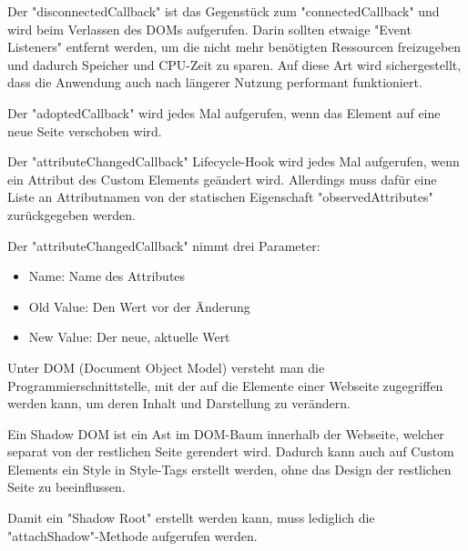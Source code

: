    
Der "{\ttfamily disconnectedCallback}" ist das Gegenstück zum "{\ttfamily connectedCallback}" und wird beim Verlassen des DOMs aufgerufen. Darin sollten etwaige "Event Listeners" entfernt werden, um die nicht mehr benötigten Ressourcen freizugeben und dadurch Speicher und CPU-Zeit zu sparen. 
Auf diese Art wird sichergestellt, dass die Anwendung auch nach längerer Nutzung performant funktioniert. \cite{MDNWebCustomElements}


Der "{\ttfamily adoptedCallback}" wird jedes Mal aufgerufen, wenn das Element auf eine neue Seite verschoben wird. \cite{MDNWebCustomElements}


Der "{\ttfamily attributeChangedCallback}" Lifecycle-Hook wird jedes Mal aufgerufen, wenn ein Attribut des Custom Elements geändert wird. Allerdings muss dafür eine Liste an Attributnamen von der statischen Eigenschaft "{\ttfamily observedAttributes}" zurückgegeben werden. \cite{MDNWebCustomElements}
    
Der "{\ttfamily attributeChangedCallback}" nimmt drei Parameter\cite{MDNWebCustomElements}:
\begin{itemize}
    \item Name: Name des Attributes
    \item Old Value: Den Wert vor der Änderung
    \item New Value: Der neue, aktuelle Wert 
\end{itemize}


\pagebreak
{}

Unter DOM (Document Object Model) versteht man die Programmierschnittstelle, mit der auf die Elemente einer Webseite zugegriffen werden kann, um deren Inhalt und Darstellung zu verändern. \cite{MDNDOM}

Ein Shadow DOM ist ein Ast im DOM-Baum innerhalb der Webseite, welcher separat von der restlichen Seite gerendert wird.
Dadurch kann auch auf Custom Elements ein Style in Style-Tags erstellt werden, ohne das Design der restlichen Seite zu beeinflussen. \cite{MDNShadowRoot}

Damit ein "Shadow Root" erstellt werden kann, muss lediglich die "{\ttfamily attachShadow}"-Methode aufgerufen werden. \cite{MDNShadowRoot}

